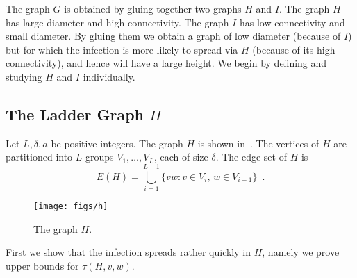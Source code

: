 \documentclass{patmorin}
\begin{document}
The graph $G$ is obtained by gluing together two graphs $H$ and $I$.
The graph $H$ has large diameter and high connectivity.  The graph $I$
has low connectivity and small diameter.  By gluing them we obtain a graph
of low diameter (because of $I$) but for which the infection is more likely to spread via $H$ (because of its high connectivity), and hence will have a large height.  We begin by
defining and studying $H$ and $I$ individually.


\subsection{The Ladder Graph $H$}

Let $L,\delta,a$ be positive integers.
The graph $H$ is shown in~.  The vertices of $H$ are partitioned into $L$ groups
$V_1,\ldots,V_L$, each of size $\delta$. The edge set of $H$ is
\[
   E(H) = \bigcup_{i=1}^{L-1} \{vw : v\in V_{i},\, w\in V_{i+1}\} \enspace .
\]
\begin{figure}
  \begin{center}
    \texttt{[image: figs/h]} 
  \end{center}
  \caption{The graph $H$.}
\end{figure}

First we show that the infection spreads rather quickly in $H$, namely we prove upper bounds for $\tau(H,v,w)$.
\end{document}
